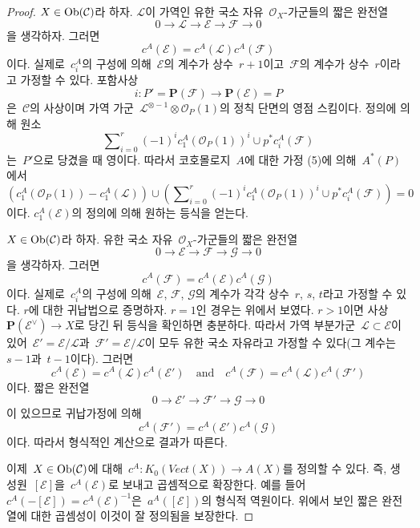 \begin{proof}
\medskip\noindent
$X \in \mathop{\mathrm{Ob}}\nolimits(\mathcal{C})$라 하자. $\mathcal{L}$이 가역인 유한 국소
자유\  $\mathcal{O}_X$-가군들의 짧은 완전열
$$
0 \to \mathcal{L} \to \mathcal{E} \to \mathcal{F} \to 0
$$
을 생각하자. 그러면
$$
c^A(\mathcal{E}) = c^A(\mathcal{L}) c^A(\mathcal{F})
$$
이다. 실제로\  $c^A_i$의 구성에 의해\  $\mathcal{E}$의 계수가 상수\ 
$r + 1$이고\  $\mathcal{F}$의 계수가 상수\  $r$이라고 가정할 수 있다.
포함사상
$$
i : P' = \mathbf{P}(\mathcal{F}) \longrightarrow \mathbf{P}(\mathcal{E}) = P
$$
은\  $\mathcal{C}$의 사상이며 가역 가군\ 
$\mathcal{L}^{\otimes -1} \otimes \mathcal{O}_P(1)$의 정칙 단면의
영점 스킴이다. 정의에 의해 원소
$$
\sum\nolimits_{i = 0}^r (-1)^i c_1^A(\mathcal{O}_P(1))^i \cup
p^*c^A_i(\mathcal{F})
$$
는\  $P'$으로 당겼을 때 영이다. 따라서 코호몰로지\  $A$에 대한 가정
(5)에 의해\  $A^*(P)$에서
$$
\left(c_1^A(\mathcal{O}_P(1)) - c_1^A(\mathcal{L})\right) \cup
\left(\sum\nolimits_{i = 0}^r (-1)^i c_1^A(\mathcal{O}_P(1))^i \cup
p^*c^A_i(\mathcal{F})\right) = 0
$$
이다. $c_1^A(\mathcal{E})$의 정의에 의해 원하는 등식을 얻는다.

\medskip\noindent
$X \in \mathop{\mathrm{Ob}}\nolimits(\mathcal{C})$라 하자. 유한 국소 자유\ 
$\mathcal{O}_X$-가군들의 짧은 완전열
$$
0 \to \mathcal{E} \to \mathcal{F} \to \mathcal{G} \to 0
$$
을 생각하자. 그러면
$$
c^A(\mathcal{F}) = c^A(\mathcal{E}) c^A(\mathcal{G})
$$
이다. 실제로\  $c^A_i$의 구성에 의해\  $\mathcal{E}$, $\mathcal{F}$,
$\mathcal{G}$의 계수가 각각 상수\  $r$, $s$, $t$라고 가정할 수 있다.
$r$에 대한 귀납법으로 증명하자. $r = 1$인 경우는 위에서 보였다.
$r > 1$이면 사상\  $\mathbf{P}(\mathcal{E}^\vee) \to X$로 당긴 뒤
등식을 확인하면 충분하다. 따라서 가역 부분가군\ 
$\mathcal{L} \subset \mathcal{E}$이 있어\ 
$\mathcal{E}' = \mathcal{E}/\mathcal{L}$과\ 
$\mathcal{F}' = \mathcal{E}/\mathcal{L}$이 모두 유한 국소 자유라고
가정할 수 있다(그 계수는\  $s - 1$과\  $t - 1$이다). 그러면
$$
c^A(\mathcal{E}) = c^A(\mathcal{L}) c^A(\mathcal{E}')
\quad\text{and}\quad
c^A(\mathcal{F}) = c^A(\mathcal{L}) c^A(\mathcal{F}')
$$
이다. 짧은 완전열
$$
0 \to \mathcal{E}' \to \mathcal{F}' \to \mathcal{G} \to 0
$$
이 있으므로 귀납가정에 의해
$$
c^A(\mathcal{F}') = c^A(\mathcal{E}') c^A(\mathcal{G})
$$
이다. 따라서 형식적인 계산으로 결과가 따른다.

\medskip\noindent
이제\  $X \in \mathop{\mathrm{Ob}}\nolimits(\mathcal{C})$에 대해\ 
$c^A : K_0(\textit{Vect}(X)) \to A(X)$를 정의할 수 있다. 즉,
생성원\  $[\mathcal{E}]$을\  $c^A(\mathcal{E})$로 보내고 곱셈적으로
확장한다. 예를 들어\ 
$c^A(-[\mathcal{E}]) = c^A(\mathcal{E})^{-1}$은\ 
$a^A([\mathcal{E}])$의 형식적 역원이다. 위에서 보인 짧은 완전열에
대한 곱셈성이 이것이 잘 정의됨을 보장한다.


\end{proof}
